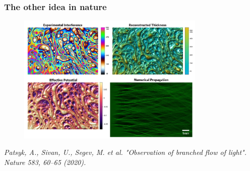 \frametitle{The other idea in nature}

\begin{figure}[h]
    \centering
    \includegraphics[width=0.8\textwidth]{images/nature_article.png}
\end{figure}
\textit{Patsyk, A., Sivan, U., Segev, M. et al. "Observation of branched flow of light". Nature 583, 60–65 (2020).}